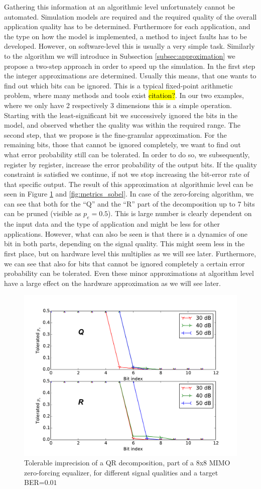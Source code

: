 \documentclass[conference]{IEEEtran}
\begin{document}
Gathering this information at an algorithmic level unfortunately cannot be automated. Simulation models are required and the required quality of the overall application quality has to be determined. Furthermore for each application, and the type on how the model is implemented, a method to inject faults has to be developed. However, on software-level this is usually a very simple task. Similarly to the algorithm we will introduce in Subsection \ref{subsec:approximation} we propose a two-step approach in order to speed up the simulation. In the first step the integer approximations are determined. Usually this means, that one wants to find out which bits can be ignored. This is a typical fixed-point arithmetic problem, where many methods and tools exist \hl{citation?}. In our two examples, where we only have 2 respectively 3 dimensions this is a simple operation. Starting with the least-significant bit we successively ignored the bits in the model, and observed whether the quality was within the required range. The second step, that we propose is the fine-granular approximation. For the remaining bits, those that cannot be ignored completely, we want to find out what error probability still can be tolerated. In order to do so, we subsequently, register by register, increase the error probability of the output bits. If the quality constraint is satisfied we continue, if not we stop increasing the bit-error rate of that specific output. The result of this approximation at algorithmic level can be seen in Figure \ref{fig:metrics_qr} and \ref{fig:metrics_sobel}. In case of the zero-forcing algorithm, we can see that both for the ``Q'' and the ``R'' part of the decomposition up to 7 bits can be pruned (visible as $p_e=0.5$). This is large number is clearly dependent on the input data and the type of application and might be less for other applications. However, what can also be seen is that there is a dynamics of one bit in both parts, depending on the signal quality. This might seem less in the first place, but on hardware level this multiplies as we will see later. Furthermore, we can see that also for bits that cannot be ignored completely a certain error probability can be tolerated. Even these minor approximations at algorithm level have a large effect on the hardware approximation as we will see later. 
\begin{figure}[tb]
  \centering
  \includegraphics[width=.5\textwidth]{figs/metrics_qr}
  \caption{Tolerable imprecision of a QR decomposition, part of a 8x8 MIMO zero-forcing equalizer, for different signal qualities and a target BER=$0.01$}
  \label{fig:metrics_qr}
\end{figure}
\end{document}

